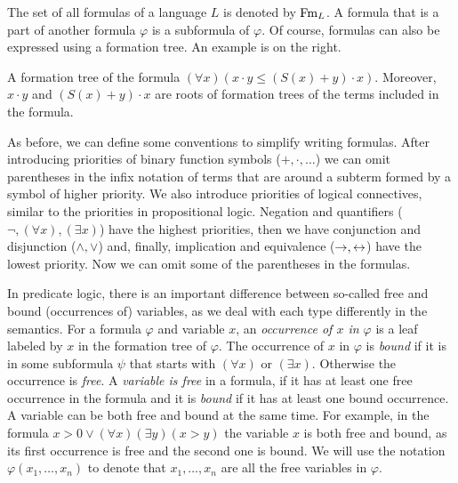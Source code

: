 The set of all formulas of a language $L$ is denoted by $\operatorname{Fm}_L$. A formula that is a part of another formula $\varphi$ is a subformula of $\varphi$. Of course, formulas can also be expressed using a formation tree. An example is on the right.

\begin{marginfigure}[-6\baselineskip]
\centering
{}
\caption{A formation tree of the formula $(\forall x) (x \cdot y \leq (S(x) + y)\cdot x)$. Moreover, $x\cdot y$ and $(S(x) + y)\cdot x$ are roots of formation trees of the terms included in the formula.}
\end{marginfigure}

As before, we can define some conventions to simplify writing formulas. After introducing priorities of binary function symbols ($+, \cdot, \dots$) we can omit parentheses in the infix notation of terms that are around a subterm formed by a symbol of higher priority. We also introduce priorities of logical connectives, similar to the priorities in propositional logic. Negation and quantifiers ($\neg, (\forall x), (\exists x)$) have the highest priorities, then we have conjunction and disjunction ($\land, \lor$) and, finally, implication and equivalence ($\to, \leftrightarrow$) have the lowest priority. Now we can omit some of the parentheses in the formulas.

In predicate logic, there is an important difference between so-called free and bound (occurrences of) variables, as we deal with each type differently in the semantics. For a formula $\varphi$ and variable $x$, an \emph{occurrence of $x$ in $\varphi$} is a leaf labeled by $x$ in the formation tree of $\varphi$. The occurrence of $x$ in $\varphi$ is \emph{bound} if it is in some subformula $\psi$ that starts with $(\forall x)$ or $(\exists x)$. Otherwise the occurrence is \emph{free}. A \emph{variable is free} in a formula, if it has at least one free occurrence in the formula and it is \emph{bound} if it has at least one bound occurrence. A variable can be both free and bound at the same time. For example, in the formula $x > 0 \lor (\forall x) (\exists y)(x > y)$ the variable $x$ is both free and bound, as its first occurrence is free and the second one is bound. We will use the notation $\varphi(x_1, \dots, x_n)$ to denote that $x_1, \dots, x_n$ are all the free variables in $\varphi$.

